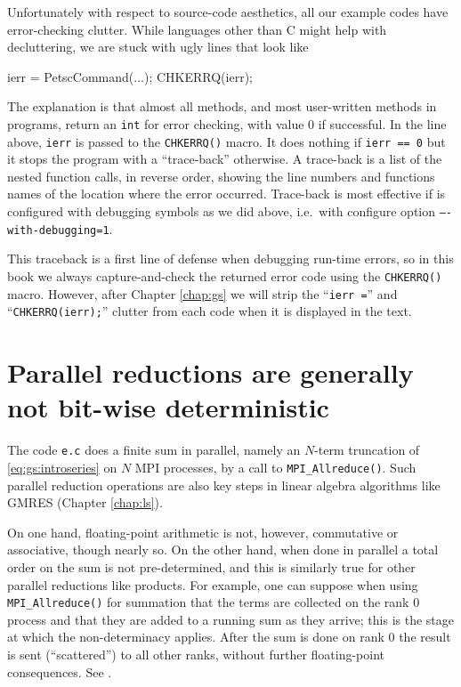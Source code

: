 Unfortunately with respect to source-code aesthetics, all our \PETSc example codes have error-checking clutter.  While languages other than C might help with decluttering, we are stuck with ugly lines that look like
\begin{code}
ierr = PetscCommand(...); CHKERRQ(ierr);
\end{code}
The explanation is that almost all \PETSc methods, and most user-written methods in \PETSc programs, return an \texttt{int} for error checking, with value $0$ if successful.  In the line above, \texttt{ierr} is passed to the \texttt{CHKERRQ()} macro.  It does nothing if \texttt{ierr == 0} but it stops the program with a ``trace-back'' otherwise.  A trace-back is a list of the nested function calls, in reverse order, showing the line numbers and functions names of the location where the error occurred.  Trace-back is most effective if \PETSc is configured with debugging symbols as we did above, i.e.~with configure option \texttt{----with-debugging=1}.

This traceback is a first line of defense when debugging run-time errors, so in this book we always capture-and-check the returned error code using the \texttt{CHKERRQ()} macro.  However, after Chapter \ref{chap:gs} we will strip the ``\texttt{ierr =}'' and ``\texttt{CHKERRQ(ierr);}'' clutter from each code when it is displayed in the text.


\section{Parallel reductions are generally not bit-wise deterministic}

The code \texttt{e.c} does a finite sum in parallel, namely an $N$-term truncation of \eqref{eq:gs:introseries} on $N$ MPI processes, by a call to \texttt{MPI\_Allreduce()}.  Such parallel reduction operations are also key steps in linear algebra algorithms like GMRES (Chapter \ref{chap:ls}).

On one hand, floating-point arithmetic is not, however, commutative or associative, though nearly so.  On the other hand, when done in parallel a total order on the sum is not pre-determined, and this is similarly true for other parallel reductions like products.  For example, one can suppose when using \texttt{MPI\_Allreduce()} for summation that the terms are collected on the rank $0$ process and that they are added to a running sum as they arrive; this is the stage at which the non-determinacy applies.  After the sum is done on rank $0$ the result is sent (``scattered'') to all other ranks, without further floating-point consequences.  See \citep{Groppetal1999}.

